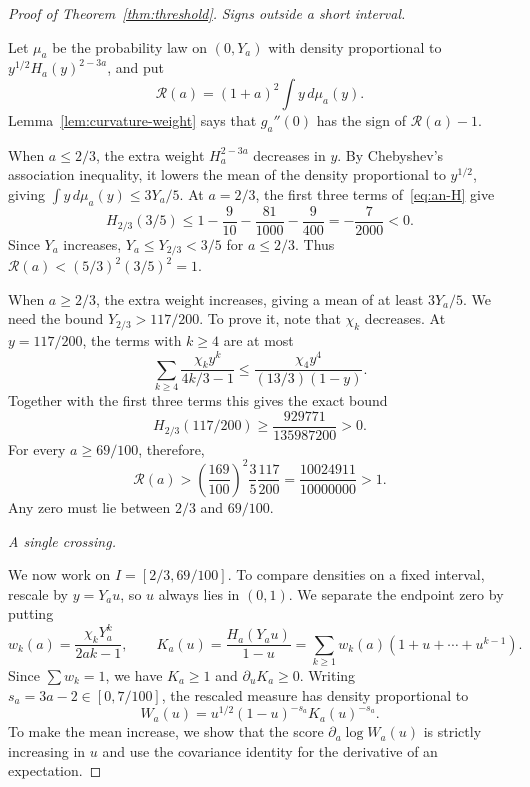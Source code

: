 \begin{proof}[Proof of Theorem~\ref{thm:threshold}]
\emph{Signs outside a short interval.}

Let $\mu_a$ be the probability law on $(0,Y_a)$ with density proportional to
$y^{1/2}H_a(y)^{2-3a}$, and put
\begin{equation}\label{eq:an-score}
 \mathcal R(a)=(1+a)^2\int y\,d\mu_a(y).
\end{equation}
Lemma~\ref{lem:curvature-weight} says that $g_a''(0)$ has the sign
of $\mathcal R(a)-1$.

When $a\le2/3$, the extra weight $H_a^{2-3a}$ decreases in $y$.
By Chebyshev's association inequality, it lowers the mean of the density proportional to
$y^{1/2}$, giving $\int y\,d\mu_a(y)\le3Y_a/5$.
At $a=2/3$, the first three terms of~\eqref{eq:an-H} give
\[
 H_{2/3}(3/5)
 \le1-\frac9{10}-\frac{81}{1000}-\frac9{400}
 =-\frac7{2000}<0.
\]
Since $Y_a$ increases, $Y_a\le Y_{2/3}<3/5$ for $a\le2/3$.
Thus $\mathcal R(a)<(5/3)^2(3/5)^2=1$.

When $a\ge2/3$, the extra weight increases, giving a mean of at least
$3Y_a/5$. We need the bound
$Y_{2/3}>117/200$. To prove it, note that $\chi_k$ decreases.
At $y=117/200$, the terms with $k\ge4$ are at most
\[
 \sum_{k\ge4}\frac{\chi_ky^k}{4k/3-1}
 \le\frac{\chi_4y^4}{(13/3)(1-y)}.
\]
Together with the first three terms this gives the exact bound
\[
 H_{2/3}(117/200)\ge\frac{929771}{135987200}>0.
\]
For every $a\ge69/100$, therefore,
\[
 \mathcal R(a)>
 \left(\frac{169}{100}\right)^2\frac35\frac{117}{200}
 =\frac{10024911}{10000000}>1.
\]
Any zero must lie between $2/3$ and $69/100$.

\emph{A single crossing.}

We now work on $I=[2/3,69/100]$. To compare densities on a fixed
interval, rescale by $y=Y_au$, so $u$ always lies in $(0,1)$.
We separate the endpoint zero by putting
\begin{equation}\label{eq:an-weights}
 w_k(a)=\frac{\chi_kY_a^k}{2ak-1},\qquad
 K_a(u)=\frac{H_a(Y_au)}{1-u}
       =\sum_{k\ge1}w_k(a)(1+u+\cdots+u^{k-1}).
\end{equation}
Since $\sum w_k=1$, we have $K_a\ge1$ and $\partial_uK_a\ge0$.
Writing $s_a=3a-2\in[0,7/100]$, the rescaled measure has density
proportional to
\begin{equation}\label{eq:an-rescaled-weight}
 W_a(u)=u^{1/2}(1-u)^{-s_a}K_a(u)^{-s_a}.
\end{equation}
To make the mean increase, we show that the score
$\partial_a\log W_a(u)$ is strictly increasing in $u$ and use
the covariance identity for the derivative of an expectation.


\end{proof}
